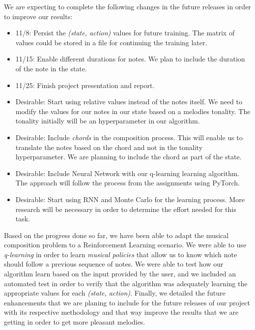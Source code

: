 We are expecting to complete the following changes in the future releases in order to improve our results:

\begin{itemize}
  \item 11/8: Persist the \emph{(state, action)} values for future training. The matrix of values could be stored in a file for continuing the training later.
  \item 11/15: Enable different durations for notes. We plan to include the duration of the note in the state.
  \item 11/25: Finish project presentation and report.
  \item Desirable: Start using relative values instead of the notes itself. We need to modify the values for our notes in our state based on a melodies tonality. The tonality initially will be an hyperparameter in our algorithm.
  \item Desirable: Include \emph{chords} in the composition process. This will enable us to translate the notes based on the chord and not in the tonality hyperparameter. We are planning to include the chord as part of the state.
  \item Desirable: Include Neural Network with our q-learning learning algorithm. The approach will follow the process from the assignments using PyTorch.
  \item Desirable: Start using RNN and Monte Carlo for the learning process. More research will be necessary in order to determine the effort needed for this task.
\end{itemize}

Based on the progress done so far, we have been able to adapt the musical composition problem to a Reinforcement Learning scenario. We were able to use \emph{q-learning} in order to learn \emph{musical policies} that allow us to know which note should follow a previous sequence of notes. We were able to test how our algorithm learn based on the input provided by the user, and we included an automated test in order to verify that the algorithm was adequately learning the appropriate values for each \emph{(state, action)}. Finally, we detailed the future enhancements that we are planing to include for the future releases of our project with its respective methodology and that way improve the results that we are getting in order to get more pleasant melodies.